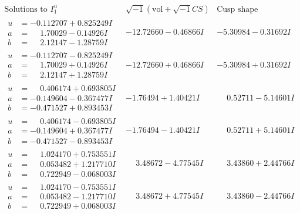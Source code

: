 \documentclass[1p]{elsarticle_modified}
\theoremstyle{definition}
\newcommand{\I}{\sqrt{-1}}
\begin{document}
$$\begin{array}{c|c|c}  
\text{Solutions to }I^u_{1}& \I (\text{vol} + \sqrt{-1}CS) & \text{Cusp shape}\\
 \hline 
\begin{aligned}
u &= -0.112707 + 0.825249 I \\
a &= \phantom{-}1.70029 - 0.14926 I \\
b &= \phantom{-}2.12147 - 1.28759 I\end{aligned}
 & -12.72660 - 0.46866 I & -5.30984 - 0.31692 I \\ \hline\begin{aligned}
u &= -0.112707 - 0.825249 I \\
a &= \phantom{-}1.70029 + 0.14926 I \\
b &= \phantom{-}2.12147 + 1.28759 I\end{aligned}
 & -12.72660 + 0.46866 I & -5.30984 + 0.31692 I \\ \hline\begin{aligned}
u &= \phantom{-}0.406174 + 0.693805 I \\
a &= -0.149604 - 0.367477 I \\
b &= -0.471527 + 0.893453 I\end{aligned}
 & -1.76494 + 1.40421 I & \phantom{-}0.52711 - 5.14601 I \\ \hline\begin{aligned}
u &= \phantom{-}0.406174 - 0.693805 I \\
a &= -0.149604 + 0.367477 I \\
b &= -0.471527 - 0.893453 I\end{aligned}
 & -1.76494 - 1.40421 I & \phantom{-}0.52711 + 5.14601 I \\ \hline\begin{aligned}
u &= \phantom{-}1.024170 + 0.753551 I \\
a &= \phantom{-}0.053482 + 1.217710 I \\
b &= \phantom{-}0.722949 - 0.068003 I\end{aligned}
 & \phantom{-}3.48672 - 4.77545 I & \phantom{-}3.43860 + 2.44766 I \\ \hline\begin{aligned}
u &= \phantom{-}1.024170 - 0.753551 I \\
a &= \phantom{-}0.053482 - 1.217710 I \\
b &= \phantom{-}0.722949 + 0.068003 I\end{aligned}
 & \phantom{-}3.48672 + 4.77545 I & \phantom{-}3.43860 - 2.44766 I \\ \hline\begin{aligned}

\end{aligned}
\end{array}$$
\end{document}
